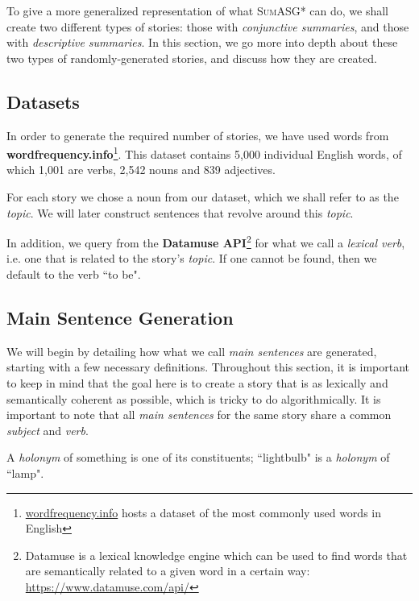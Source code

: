 To give a more generalized representation of what \textsc{SumASG*} can do, we shall create two different types of stories: those with \textit{conjunctive summaries}, and those with \textit{descriptive summaries}. In this section, we go more into depth about these two types of randomly-generated stories, and discuss how they are created.

\subsection{Datasets}

In order to generate the required number of stories, we have used words from \textbf{wordfrequency.info}\footnote{\url{wordfrequency.info} hosts a dataset of the most commonly used words in English}. This dataset contains 5,000 individual English words, of which 1,001 are verbs, 2,542 nouns and 839 adjectives.

For each story we chose a noun from our dataset, which we shall refer to as the \textit{topic}. We will later construct sentences that revolve around this \textit{topic}.

In addition, we query from the \textbf{Datamuse API}\footnote{Datamuse is a lexical knowledge engine which can be used to find words that are semantically related to a given word in a certain way: \url{https://www.datamuse.com/api/}} for what we call a \textit{lexical verb}, i.e. one that is related to the story's \textit{topic}. If one cannot be found, then we default to the verb ``to be".

\subsection{Main Sentence Generation}

We will begin by detailing how what we call \textit{main sentences} are generated, starting with a few necessary definitions. Throughout this section, it is important to keep in mind that the goal here is to create a story that is as lexically and semantically coherent as possible, which is tricky to do algorithmically. It is important to note that all \textit{main sentences} for the same story share a common \textit{subject} and \textit{verb}.

\begin{definition}[Holonym]
A \textit{holonym} of something is one of its constituents; ``lightbulb" is a \textit{holonym} of ``lamp".
\end{definition}

